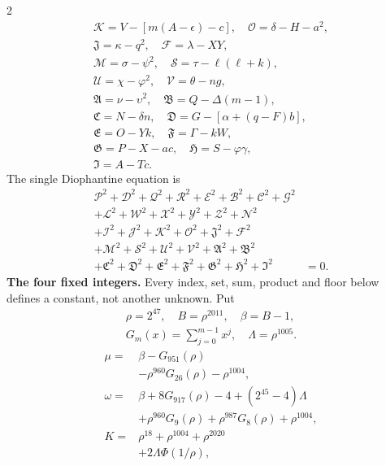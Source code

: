 \documentclass[10pt]{article}
\begin{document}
\begin{multicols}{2}
\[\begin{gathered}
\mathcal{K}=V-[m(A-\epsilon)-c],\quad\mathcal{O}=\delta-H-a^2,\\
\mathfrak{J}=\kappa-q^2,\quad\mathcal{F}=\lambda-XY,\\
\mathcal{M}=\sigma-\psi^2,\quad\mathcal{S}=\tau-\ell(\ell+k),\\
\mathcal{U}=\chi-\varphi^2,\quad\mathcal{V}=\theta-ng,\\
\mathfrak{A}=\nu-\upsilon^2,\quad\mathfrak{B}=Q-\Delta(m-1),\\
\mathfrak{C}=N-\delta n,\quad\mathfrak{D}=G-[\alpha+(q-F)b],\\
\mathfrak{E}=O-Yk,\quad\mathfrak{F}=\Gamma-kW,\\
\mathfrak{G}=P-X-ac,\quad\mathfrak{H}=S-\varphi\gamma,\\
\mathfrak{I}=A-Tc.
\end{gathered}
\]
The single Diophantine equation is
\[
\begin{split}
\mathcal{P}^2+\mathcal{D}^2+\mathcal{Q}^2+\mathcal{R}^2+\mathcal{E}^2+\mathcal{B}^2+\mathcal{C}^2+\mathcal{G}^2 &\\
+\mathcal{L}^2+\mathcal{W}^2+\mathcal{X}^2+\mathcal{Y}^2+\mathcal{Z}^2+\mathcal{N}^2 &\\
+\mathcal{I}^2+\mathcal{J}^2+\mathcal{K}^2+\mathcal{O}^2+\mathfrak{J}^2+\mathcal{F}^2 &\\
+\mathcal{M}^2+\mathcal{S}^2+\mathcal{U}^2+\mathcal{V}^2+\mathfrak{A}^2+\mathfrak{B}^2 &\\
+\mathfrak{C}^2+\mathfrak{D}^2+\mathfrak{E}^2+\mathfrak{F}^2+\mathfrak{G}^2+\mathfrak{H}^2+\mathfrak{I}^2 &= 0.
\end{split}
\]
\textbf{The four fixed integers.}
Every index, set, sum, product and floor below defines a constant, not
another unknown. Put
\[
\begin{gathered}
\rho=2^{47},\quad B=\rho^{2011},\quad\beta=B-1,\\
G_m(x)=\sum_{j=0}^{m-1}x^j,\quad
\Lambda=\rho^{1005}.
\end{gathered}
\]
\begin{align*}
\mu={}&\beta-G_{951}(\rho)\\
&-\rho^{960}G_{26}(\rho)-\rho^{1004},\\
\omega={}&\beta+8G_{917}(\rho)-4+(2^{45}-4)\Lambda\\
&+\rho^{960}G_9(\rho)+\rho^{987}G_8(\rho)
  +\rho^{1004},\\
K={}&\rho^{18}+\rho^{1004}+\rho^{2020}\\
&+2\Lambda\Phi(1/\rho),
\end{align*}

\end{multicols}
\end{document}
